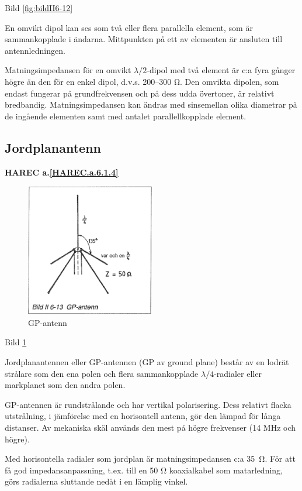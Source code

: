 Bild \ref{fig:bildII6-12}

En omvikt dipol kan ses som två eller flera parallella element, som är
sammankopplade i ändarna. Mittpunkten på ett av elementen är ansluten
till antennledningen.

Matningsimpedansen för en omvikt \(\lambda/2\)-dipol med två element är
c:a fyra gånger högre än den för en enkel dipol, d.v.s. 200--300
Ω. Den omvikta dipolen, som endast fungerar på grundfrekvensen och på
dess udda övertoner, är relativt bredbandig. Matningsimpedansen kan
ändras med sinsemellan olika diametrar på de ingående elementen samt
med antalet parallellkopplade element.

\subsection{Jordplanantenn}
\textbf{
HAREC a.\ref{HAREC.a.6.1.4}\label{myHAREC.a.6.1.4}
}

\begin{figure}
  \includegraphics[width=0.5\textwidth]{images/bild_2_6-13}
  \caption{GP-antenn}
  \label{fig:bildII6-13}
\end{figure}

Bild \ref{fig:bildII6-13}

Jordplanantennen eller GP-antennen (GP av ground plane) består av en
lodrät strålare som den ena polen och flera sammankopplade
\(\lambda/4\)-radialer eller markplanet som den andra polen.

GP-antennen är rundstrålande och har vertikal polarisering. Dess
relativt flacka utstrålning, i jämförelse med en horisontell antenn,
gör den lämpad för långa distanser.  Av mekaniska skäl används den
mest på högre frekvenser (14 MHz och högre).

Med horisontella radialer som jordplan är matningsimpedansen c:a 35~Ω.
För att få god impedansanpassning, t.ex. till en 50 Ω koaxialkabel
som matarledning, görs radialerna sluttande nedåt i en lämplig vinkel.

